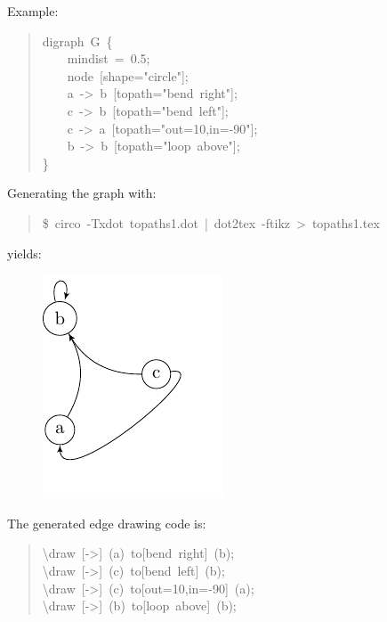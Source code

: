 \documentclass[10pt,a4paper,english]{article}
\newlength{\admonitionwidth}
\begin{document}
Example:
\begin{quote}{\ttfamily \raggedright \noindent
digraph~G~{\{}~\\
~~~~mindist~=~0.5;~\\
~~~~node~{[}shape="circle"{]};~\\
~~~~a~->~b~{[}topath="bend~right"{]};~\\
~~~~c~->~b~{[}topath="bend~left"{]};~\\
~~~~c~->~a~{[}topath="out=10,in=-90"{]};~\\
~~~~b~->~b~{[}topath="loop~above"{]};~\\
{\}}
}\end{quote}

Generating the graph with:
\begin{quote}{\ttfamily \raggedright \noindent
{\$}~circo~-Txdot~topaths1.dot~|~dot2tex~-ftikz~>~topaths1.tex
}\end{quote}

yields:
\begin{figure}[H]
\centering

\includegraphics{pdf/topaths1}
\end{figure}

The generated edge drawing code is:
\begin{quote}{\ttfamily \raggedright \noindent
{\textbackslash}draw~{[}->{]}~(a)~to{[}bend~right{]}~(b);~\\
{\textbackslash}draw~{[}->{]}~(c)~to{[}bend~left{]}~(b);~\\
{\textbackslash}draw~{[}->{]}~(c)~to{[}out=10,in=-90{]}~(a);~\\
{\textbackslash}draw~{[}->{]}~(b)~to{[}loop~above{]}~(b);
}\end{quote}
\begin{center}\begin{sffamily}
\end{sffamily}
\end{center}
\end{document}
